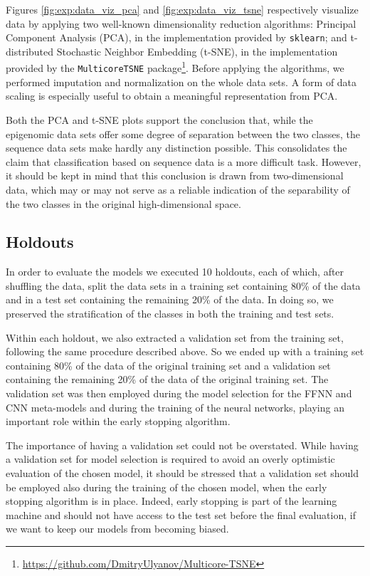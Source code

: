 \documentclass{article}
\begin{document}
Figures \ref{fig:exp:data_viz_pca} and \ref{fig:exp:data_viz_tsne} respectively visualize data by applying two well-known dimensionality reduction algorithms: Principal Component Analysis (PCA), in the implementation provided by \texttt{sklearn}; and t-distributed Stochastic Neighbor Embedding (t-SNE), in the implementation provided by the \texttt{MulticoreTSNE} package\footnote{\url{https://github.com/DmitryUlyanov/Multicore-TSNE}}. Before applying the algorithms, we performed imputation and normalization on the whole data sets. A form of data scaling is especially useful to obtain a meaningful representation from PCA.

Both the PCA and t-SNE plots support the conclusion that, while the epigenomic data sets offer some degree of separation between the two classes, the sequence data sets make hardly any distinction possible. This consolidates the claim that classification based on sequence data is a more difficult task. However, it should be kept in mind that this conclusion is drawn from two-dimensional data, which may or may not serve as a reliable indication of the separability of the two classes in the original high-dimensional space.    


\subsection{Holdouts}
\label{subsec:exp:holdouts}

In order to evaluate the models we executed 10 holdouts, each of which, after shuffling the data, split the data sets in a training set containing 80\% of the data and in a test set containing the remaining 20\% of the data. In doing so, we preserved the stratification of the classes in both the training and test sets.

Within each holdout, we also extracted a validation set from the training set, following the same procedure described above. So we ended up with a training set containing 80\% of the data of the original training set and a validation set containing the remaining 20\% of the data of the original training set. The validation set was then employed during the model selection for the FFNN and CNN meta-models and during the training of the neural networks, playing an important role within the early stopping algorithm.

The importance of having a validation set could not be overstated. While having a validation set for model selection is required to avoid an overly optimistic evaluation of the chosen model, it should be stressed that a validation set should be employed also during the training of the chosen model, when the early stopping algorithm is in place. Indeed, early stopping is part of the learning machine and should not have access to the test set before the final evaluation, if we want to keep our models from becoming biased.
\end{document}
